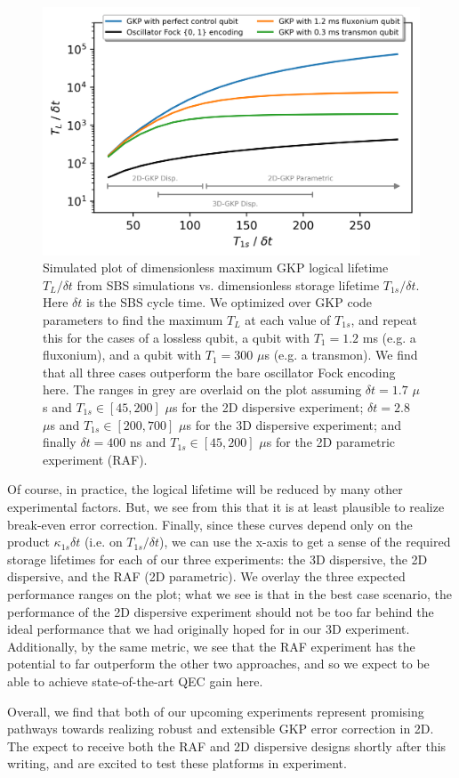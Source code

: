 \begin{figure}[t]
    \centering
    \includegraphics[width=0.8\linewidth]{Figures/5/2D_vs_3D_SBS_Comparison.png}
    \caption{Simulated plot of dimensionless maximum GKP logical lifetime $T_L/\delta t$ from SBS simulations vs. dimensionless storage lifetime $T_{1s}/\delta t$. Here $\delta t$ is the SBS cycle time. We optimized over GKP code parameters to find the maximum $T_L$ at each value of $T_{1s}$, and repeat this for the cases of a lossless qubit, a qubit with $T_1 = 1.2$ ms (e.g. a fluxonium), and a qubit with $T_1 = 300$ $\mu$s (e.g. a transmon). We find that all three cases outperform the bare oscillator Fock encoding here. The ranges in grey are overlaid on the plot assuming $\delta t = 1.7$ $\mu$s and $T_{1s} \in [45, 200]$ $\mu$s for the 2D dispersive experiment; $\delta t = 2.8$ $\mu$s and $T_{1s} \in [200, 700]$ $\mu$s for the 3D dispersive experiment; and finally $\delta t = 400$ ns and $T_{1s} \in [45, 200]$ $\mu$s for the 2D parametric experiment (RAF).}
    \label{fig:2D_vs_3D_SBS_Comparison}
\end{figure}

\noindent Of course, in practice, the logical lifetime will be reduced by many other experimental factors. But, we see from this that it is at least plausible to realize break-even error correction. Finally, since these curves depend only on the product $\kappa_{1s}\delta t$ (i.e. on $T_{1s}/\delta t$), we can use the x-axis to get a sense of the required storage lifetimes for each of our three experiments: the 3D dispersive, the 2D dispersive, and the RAF (2D parametric). We overlay the three expected performance ranges on the plot; what we see is that in the best case scenario, the performance of the 2D dispersive experiment should not be too far behind the ideal performance that we had originally hoped for in our 3D experiment. Additionally, by the same metric, we see that the RAF experiment has the potential to far outperform the other two approaches, and so we expect to be able to achieve state-of-the-art QEC gain here.

Overall, we find that both of our upcoming experiments represent promising pathways towards realizing robust and extensible GKP error correction in 2D. The expect to receive both the RAF and 2D dispersive designs shortly after this writing, and are excited to test these platforms in experiment.  



\printbibliography[heading=subbibliography, title = References]